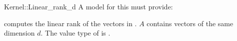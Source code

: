 \begin{ccRefFunctionObjectConcept}{Kernel::Linear_rank_d}
A model for this must provide:


 {computes
  the linear rank of the vectors in \ccc{A = tuple [first,last)}.
  \ccPrecond \ccPrecond $A$ contains vectors of the same dimension
  $d$.  \ccRequire The value type of  is
  .}

\end{ccRefFunctionObjectConcept}
